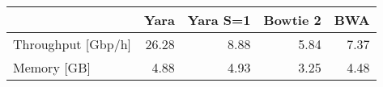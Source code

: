 \begin{tabular}{lrrrr}
  \toprule
 & Yara & Yara S=1 & Bowtie 2 & BWA \\ 
  \midrule
Throughput [Gbp/h] & 26.28 & 8.88 & 5.84 & 7.37 \\ 
  Memory [GB] & 4.88 & 4.93 & 3.25 & 4.48 \\ 
   \bottomrule
\end{tabular}
